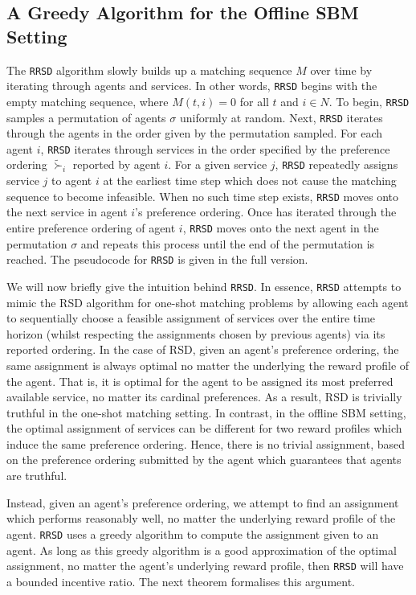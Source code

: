 \documentclass[letterpaper,11pt]{article}
\begin{document}
\subsection{A Greedy Algorithm for the Offline SBM Setting}
The \texttt{RRSD} algorithm slowly builds up a matching sequence $M$ over time by iterating through agents and services. In other words, \texttt{RRSD} begins with the empty matching sequence, where $M(t, i) = 0$ for all $t$ and $i \in N$. To begin, \texttt{RRSD} samples a permutation of agents $\sigma$ uniformly at random. Next, \texttt{RRSD} iterates through the agents in the order given by the permutation sampled. For each agent $i$, \texttt{RRSD} iterates through services in the order specified by the preference ordering $\tilde{\succ}_{i}$ reported by agent $i$. For a given service $j$, \texttt{RRSD} repeatedly assigns service $j$ to agent $i$ at the earliest time step which does not cause the matching sequence to become infeasible. When no such time step exists, \texttt{RRSD}  moves onto the next service in agent $i$'s preference ordering. Once  has iterated through the entire preference ordering of agent $i$, \texttt{RRSD} moves onto the next agent in the permutation $\sigma$ and repeats this process until the end of the permutation is reached.  The pseudocode for \texttt{RRSD} is given in the full version.

We will now briefly give the intuition behind \texttt{RRSD}. In essence, \texttt{RRSD} attempts to mimic the RSD algorithm for one-shot matching problems by allowing each agent to sequentially choose a feasible assignment of services over the entire time horizon (whilst respecting the assignments chosen by previous agents) via its reported ordering. In the case of RSD, given an agent's preference ordering, the same assignment is always optimal no matter the underlying the reward profile of the agent. That is, it is optimal for the agent to be assigned its most preferred available service, no matter its cardinal preferences. As a result, RSD is trivially truthful in the one-shot matching setting. In contrast, in the offline SBM setting, the optimal assignment of services can be different for two reward profiles which induce the same preference ordering. Hence, there is no trivial assignment, based on the preference ordering submitted by the agent which guarantees that agents are truthful.

Instead, given an agent's preference ordering, we attempt to find an assignment which performs reasonably well, no matter the underlying reward profile of the agent. \texttt{RRSD} uses a greedy algorithm to compute the assignment given to an agent. As long as this greedy algorithm is a good approximation of the optimal assignment, no matter the agent's underlying reward profile, then \texttt{RRSD} will have a bounded incentive ratio. The next theorem formalises this argument.%
\end{document}
